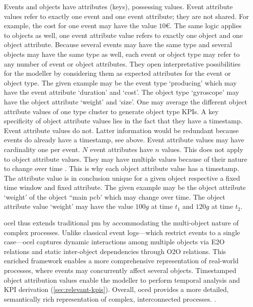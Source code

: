 Events and objects have attributes (keys), possessing values. Event attribute values refer to exactly one event and one event attribute; they are not shared. For example, the cost for one event may have the value $10€$. The same logic applies to objects as well, one event attribute value refers to exactly one object and one object attribute. Because several events may have the same type and several objects may have the same type as well, each event or object type may refer to any number of event or object attributes. They open interpretative possibilities for the modeller by considering them as expected attributes for the event or object type. The given example may be the event type `producing' which may have the event attribute `duration' and `cost'. The object type `gyroscope' may have the object attribute `weight' and `size'. One may average the different object attribute values of one type cluster to generate object type KPIs. A key specificity of object attribute values lies in the fact that they have a timestamp. Event attribute values do not. Latter information would be redundant because events do already have a timestamp, see above. Event attribute values may have cardinality one per event. $N$ event attributes have $n$ values. This does not apply to object attribute values. They may have multiple values because of their nature to change over time \autocite{van2023object}. This is why each object attribute value has a timestamp. The attribute value is in conclusion unique for a given object respective a fixed time window and fixed attribute. The given example may be the object attribute `weight' of the object ``main pcb' which may change over time. The object attribute value `weight' may have the value $100g$ at time $t_1$ and $120g$ at time $t_2$.

\gls{ocel} thus extends traditional \gls{pm} by accommodating the  multi-object nature of complex processes. Unlike classical event logs—which restrict events to a single case—\gls{ocel} captures dynamic interactions among multiple objects via E2O relations and static inter-object dependencies through O2O relations. This enriched framework enables a more comprehensive representation of real-world processes, where events may concurrently affect several objects. Timestamped object attribution values enable the modeller to perform temporal analysis and KPI derivation (\autoref{sec:relevant-kpis}). Overall, \gls{oced} provides a more detailed, semantically rich representation of complex, interconnected processes. \autocite{van2023object}.


